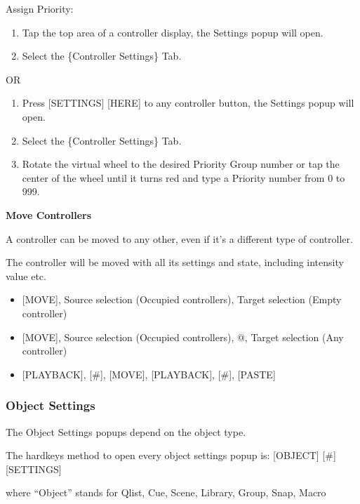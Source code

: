 \documentclass[
]{article}
\begin{document}
Assign Priority:

\begin{enumerate}
\def\labelenumi{\arabic{enumi}.}
\item
  Tap the top area of a controller display, the Settings popup will open.
\item
  Select the \{Controller Settings\} Tab.
\end{enumerate}

OR

\begin{enumerate}
\def\labelenumi{\arabic{enumi}.}
\item
  Press {[}SETTINGS{]} {[}HERE{]} to any controller button, the Settings popup will open.
\item
  Select the \{Controller Settings\} Tab.
\item
  Rotate the virtual wheel to the desired Priority Group number or tap the center of the wheel until it turns red and type a Priority number from 0 to 999.
\end{enumerate}

\textbf{Move Controllers}

A controller can be moved to any other, even if it's a different type of controller.

The controller will be moved with all its settings and state, including intensity value etc.

\begin{itemize}
\item
  {[}MOVE{]}, Source selection (Occupied controllers), Target selection (Empty controller)
\item
  {[}MOVE{]}, Source selection (Occupied controllers), @, Target selection (Any controller)
\item
  {[}PLAYBACK{]}, {[}\#{]}, {[}MOVE{]}, {[}PLAYBACK{]}, {[}\#{]}, {[}PASTE{]}
\end{itemize}

\hypertarget{object-settings}{%
\subsubsection{Object Settings}\label{object-settings}}

The Object Settings popups depend on the object type.

The hardkeys method to open every object settings popup is: {[}OBJECT{]} {[}\#{]} {[}SETTINGS{]}

where ``Object'' stands for Qlist, Cue, Scene, Library, Group, Snap, Macro
\end{document}
